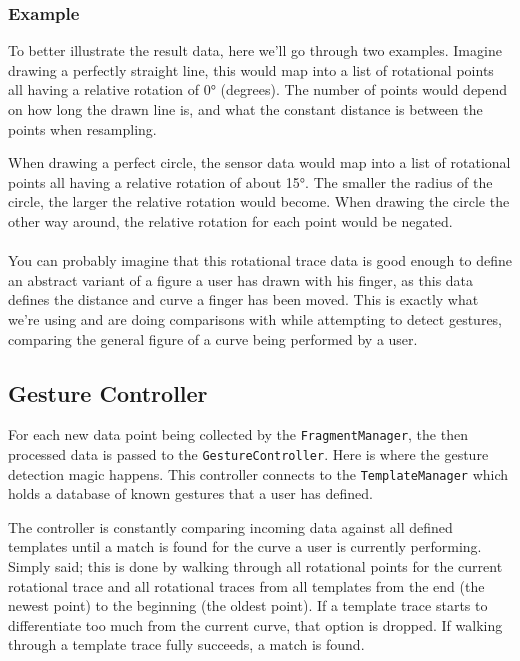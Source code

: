 \documentclass{standalone}
\begin{document}
  \subsubsection{Example}
  To better illustrate the result data, here we'll go through two examples.
  Imagine drawing a perfectly straight line, this would map into a list of
  rotational points all having a relative rotation of 0\si{\degree} (degrees).
  The number of points would depend on how long the drawn line is, and what the
  constant distance is between the points when resampling.

  When drawing a perfect circle, the sensor data would map into a list of
  rotational points all having a relative rotation of about 15\si{\degree}. The
  smaller the radius of the circle, the larger the relative rotation would
  become. When drawing the circle the other way around, the relative rotation
  for each point would be negated.

  \paragraph{}
  You can probably imagine that this rotational trace data is good enough to
  define an abstract variant of a figure a user has drawn with his
  finger, as this data defines the distance and curve a finger has been moved.
  This is exactly what we're using and are doing comparisons with while
  attempting to detect gestures, comparing the general figure of a curve being
  performed by a user.

  \subsection{Gesture Controller}
  For each new data point being collected by the \verb_FragmentManager_, the
  then processed data is passed to the \verb_GestureController_. Here is where
  the gesture detection magic happens. This controller connects to the
  \verb_TemplateManager_ which holds a database of known gestures that a user
  has defined.

  The controller is constantly comparing incoming data against all
  defined templates until a match is found for the curve a user is currently
  performing. Simply said; this is done by walking through all rotational points
  for the current rotational trace and all rotational traces from all templates
  from the end (the newest point) to the beginning (the oldest point). If a
  template trace starts to differentiate too much from the current curve, that
  option is dropped. If walking through a template trace fully succeeds, a
  match is found.
\end{document}
